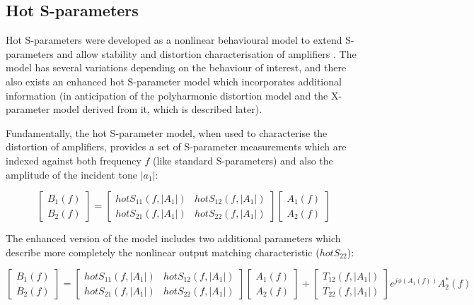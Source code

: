 \documentclass[../thesis/thesis.tex]{subfiles}
\begin{document}
\subsection{Hot S-parameters}

Hot S-parameters were developed as a nonlinear behavioural model to extend S-parameters and allow stability and distortion characterisation of amplifiers \cite{Verspecht_2002, Verspecht_2005}. The model has several variations depending on the behaviour of interest, and there also exists an enhanced hot S-parameter model which incorporates additional information (in anticipation of the polyharmonic distortion model and the X-parameter model derived from it, which is described later).

Fundamentally, the hot S-parameter model, when used to characterise the distortion of amplifiers, provides a set of S-parameter measurements which are indexed against both frequency $f$ (like standard S-parameters) and also the amplitude of the incident tone $|a_1|$:

\begin{equation}
	\begin{bmatrix}
		B_1(f) \\ 
		B_2(f) 
	\end{bmatrix}
	= 
	\begin{bmatrix}
		hotS_{11}(f, |A_1|) & hotS_{12}(f, |A_1|) \\
		hotS_{21}(f, |A_1|) & hotS_{22}(f, |A_1|)
	\end{bmatrix}
	\begin{bmatrix}
	A_1(f) \\ 
	A_2(f) 
	\end{bmatrix}
\end{equation}

The enhanced version of the model includes two additional parameters which describe more completely the nonlinear output matching characteristic ($hotS_{22}$):

\begin{equation}
	\begin{bmatrix}
		B_1(f) \\ 
		B_2(f) 
	\end{bmatrix}
	= 
	\begin{bmatrix}
		hotS_{11}(f, |A_1|) & hotS_{12}(f, |A_1|) \\
		hotS_{21}(f, |A_1|) & hotS_{22}(f, |A_1|)
	\end{bmatrix}
	\begin{bmatrix}
		A_1(f) \\ 
		A_2(f) 
	\end{bmatrix}
	+
	\begin{bmatrix}
		T_{12}(f, |A_1|) \\ 
		T_{22}(f, |A_1|) 
	\end{bmatrix}
	e^{j\phi(A_1(f))}A_2^*(f)
	\label{ch5_eqn_hotsp}
\end{equation}
\end{document}
